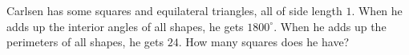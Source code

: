 Carlsen has some squares and equilateral triangles, all of side length $1$. When he adds up the interior angles of all shapes, he gets $1800^\circ$. When he adds up the perimeters of all shapes, he gets $24$. How many squares does he have?
